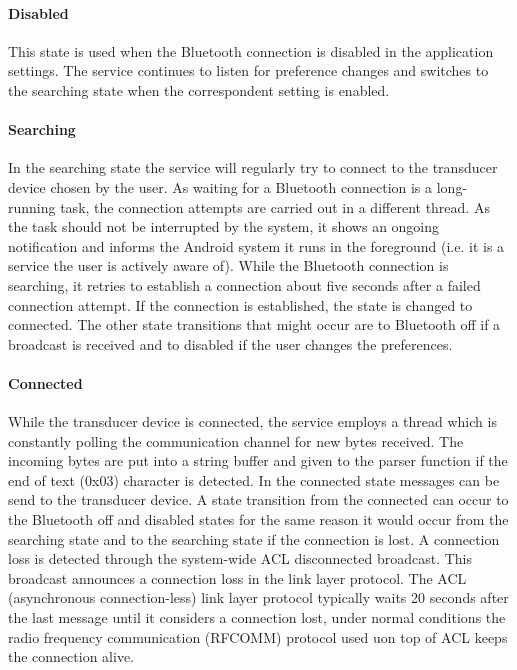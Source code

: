 \paragraph{Disabled}
This state is used when the Bluetooth connection is disabled in the application settings. The service continues to listen for preference changes and switches to the searching state when the correspondent setting is enabled.

\paragraph{Searching}
In the searching state the service will regularly try to connect to the transducer device chosen by the user. As waiting for a Bluetooth connection is a long-running task, the connection attempts are carried out in a different thread. As the task should not be interrupted by the system, it shows an ongoing notification and informs the Android system it runs in the foreground (i.e. it is a service the user is actively aware of). While the Bluetooth connection is searching, it retries to establish a connection about five seconds after a failed connection attempt. If the connection is established, the state is changed to connected. The other state transitions that might occur are to Bluetooth off if a broadcast is received and to disabled if the user changes the preferences.

\paragraph{Connected}
While the transducer device is connected, the service employs a thread which is constantly polling the communication channel for new bytes received. The incoming bytes are put into a string buffer and given to the parser function if the end of text (0x03) character is detected. In the connected state messages can be send to the transducer device. A state transition from the connected can occur to the Bluetooth off and disabled states for the same reason it would occur from the searching state and to the searching state if the connection is lost. A connection loss is detected through the system-wide ACL disconnected broadcast. This broadcast announces a connection loss in the link layer protocol. The ACL (asynchronous connection-less) link layer protocol typically waits 20 seconds after the last message until it considers a connection lost, under normal conditions the radio frequency communication (RFCOMM) protocol used uon top of ACL keeps the connection alive.

